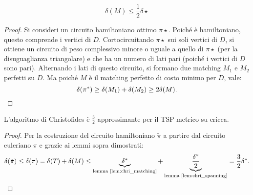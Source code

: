 \begin{lemma}\label{lem:chri_matching}
	\begin{equation*}
		\delta(M) \leq \frac 1 2 \delta\star
	\end{equation*}
\end{lemma}
\begin{proof}
	Si consideri un circuito hamiltoniano ottimo $\pi\star$. Poiché è hamiltoniano, questo comprende i vertici di $D$. Cortocircuitando $\pi\star$ sui soli vertici di $D$, si ottiene un circuito di peso complessivo minore o uguale a quello di $\pi\star$ (per la disuguaglianza triangolare) e che ha un numero di lati pari (poiché i vertici di $D$ sono pari). Alternando i lati di questo circuito, si formano due matching $M_1$ e $M_2$ perfetti su $D$. Ma poiché $M$ è il matching perfetto di costo minimo per $D$, vale:
	\begin{equation*}
		\delta(\pi\star)\geq\delta(M_1)+\delta(M_2)\geq 2\delta(M) \text. \qedhere
	\end{equation*}
\end{proof}

\begin{theorem}
	L'algoritmo di Christofides è $\frac 3 2$-approssimante per il TSP metrico su cricca.
\end{theorem}
\begin{proof}
	Per la costruzione del circuito hamiltoniano $\tilde\pi$ a partire dal circuito euleriano $\pi$ e grazie ai lemmi sopra dimostrati:
	\begin{equation*}
		\delta(\tilde\pi)\leq\delta(\pi) = \delta(T)+\delta(M)\leq
		\underbrace{\delta\star}_{\text{lemma \ref{lem:chri_matching}}} + \underbrace{\frac{\delta\star}{2}}_{\text{lemma \ref{lem:chri_spanning}}} =
		\frac 3 2 \delta\star \text.
	\end{equation*}
\end{proof}

